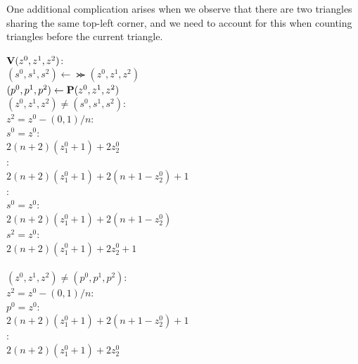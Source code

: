 One additional complication arises when we observe that there are two triangles sharing the same top-left corner, and we need to account for this when counting triangles before the current triangle. 
  \begin{algo}
    $\mathbf{V}(z^0,z^1,z^2)$:\+
    \\  $(s^0,s^1,s^2) \gets \Succ(z^0,z^1,z^2)$
    \\  $(p^0,p^1,p^2) \gets \mathbf{P}(z^0,z^1,z^2)$
    \\  \IfB $(z^0,z^1,z^2) \neq (s^0,s^1,s^2)$:\quad{}\+
    \\    \IfB $z^2 = z^0 - (0,1)/n$:\quad{}\+
    \\      \IfB $s^0 = z^0$:\quad{}\+
    \\        \ReturnB $2(n+2)(z^0_1 + 1) + 2z^0_2$\-
    \\      \ElseB:\quad{}\+
    \\        \ReturnB $2(n+2)(z^0_1 + 1) + 2(n+1-z^0_2) + 1$\-\-
    \\    \ElseB:\quad{}\+
    \\      \IfB $s^0 = z^0$:\quad{}\+
    \\        \ReturnB $2(n+2)(z^0_1 + 1) + 2(n+1-z^0_2)$\-
    \\      \ElseIfB $s^2 = z^0$:\quad{}\+
    \\        \ReturnB $2(n+2)(z^0_1 + 1) + 2z^0_2 + 1$\-\-\-
    \\ 
    \\  \IfB $(z^0,z^1,z^2) \neq (p^0,p^1,p^2)$:\quad{}\+
    \\    \IfB $z^2 = z^0 - (0,1)/n$:\quad{}\+
    \\      \IfB $p^0 = z^0$:\quad{}\+
    \\        \ReturnB $2(n+2)(z^0_1 + 1) + 2(n+1-z^0_2) + 1$\-
    \\      \ElseB:\quad{}\+
    \\        \ReturnB $2(n+2)(z^0_1 + 1) + 2z^0_2$\-\-

\end{algo}
